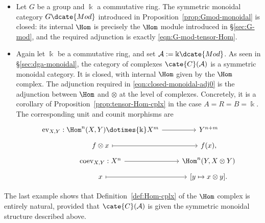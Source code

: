 \begin{itemize}
	\item Let $G$ be a group and $\Bbbk$ a commutative ring. The symmetric
	monoidal category $G\dcate{Mod}$ introduced in
	Proposition~\ref{prop:Gmod-monoidal} is closed: its internal $\Hom$ is
	precisely the $\Hom$ module introduced in \S\ref{sec:G-mod}, and the
	required adjunction is exactly \eqref{eqn:G-mod-tensor-Hom}.

	\item Again let $\Bbbk$ be a commutative ring, and set
	$\mathcal{A}:=\Bbbk\dcate{Mod}$. As seen in \S\ref{sec:dga-monoidal}, the
	category of complexes $\cate{C}(\mathcal{A})$ is a symmetric monoidal
	category. It is closed, with internal $\Hom$ given by the $\Hom$ complex.
	The adjunction required in \eqref{eqn:closed-monoidal-adj0} is the
	adjunction between $\Hom$ and $\otimes$ at the level of complexes.
	Concretely, it is a corollary of Proposition~\ref{prop:tensor-Hom-cplx} in
	the case $A=R=B=\Bbbk$. The corresponding unit and counit morphisms are
	\[\begin{tikzcd}[row sep=tiny]
		\mathrm{ev}_{X, Y}: \Hom^n(X, Y) \dotimes{\Bbbk} X^m \arrow[r] & Y^{n+m} \\
		f \otimes x \arrow[mapsto, r] & f(x), \\
		\mathrm{coev}_{X, Y}: X^n \arrow[r] & \Hom^n(Y, X \otimes Y) \\
		x \arrow[mapsto, r] & {[y \mapsto x \otimes y]}.
	\end{tikzcd}\]
\end{itemize}

The last example shows that Definition~\ref{def:Hom-cplx} of the $\Hom$
complex is entirely natural, provided that $\cate{C}(\mathcal{A})$ is given
the symmetric monoidal structure described above.
